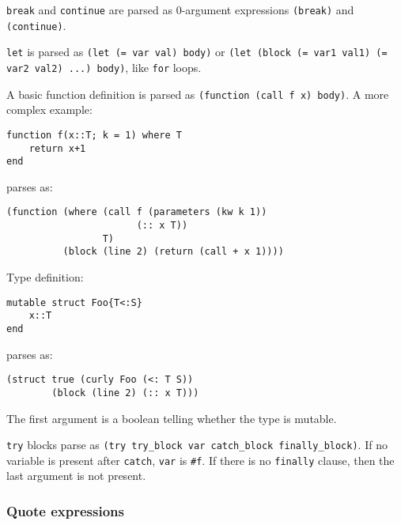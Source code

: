 \texttt{break} and \texttt{continue} are parsed as 0-argument expressions \texttt{(break)} and \texttt{(continue)}.



\texttt{let} is parsed as \texttt{(let (= var val) body)} or \texttt{(let (block (= var1 val1) (= var2 val2) ...) body)}, like \texttt{for} loops.



A basic function definition is parsed as \texttt{(function (call f x) body)}. A more complex example:




\begin{verbatim}
function f(x::T; k = 1) where T
    return x+1
end
\end{verbatim}



parses as:




\begin{lstlisting}
(function (where (call f (parameters (kw k 1))
                       (:: x T))
                 T)
          (block (line 2) (return (call + x 1))))
\end{lstlisting}



Type definition:




\begin{verbatim}
mutable struct Foo{T<:S}
    x::T
end
\end{verbatim}



parses as:




\begin{lstlisting}
(struct true (curly Foo (<: T S))
        (block (line 2) (:: x T)))
\end{lstlisting}



The first argument is a boolean telling whether the type is mutable.



\texttt{try} blocks parse as \texttt{(try try\_block var catch\_block finally\_block)}. If no variable is present after \texttt{catch}, \texttt{var} is \texttt{\#f}. If there is no \texttt{finally} clause, then the last argument is not present.



\hypertarget{15188092119950048030}{}


\subsubsection{Quote expressions}



